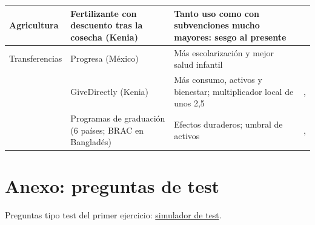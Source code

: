 \documentclass[11pt]{article}
\begin{document}
\begin{table}[H]
\begin{tabular}{>{\raggedright\arraybackslash}m{1.9cm}>{\raggedright\arraybackslash}m{4.3cm}>{\raggedright\arraybackslash}m{5.4cm}>{\raggedright\arraybackslash}m{2.9cm}}
\midrule
Agricultura & Fertilizante con descuento tras la cosecha (Kenia) & Tanto uso como con subvenciones mucho mayores: sesgo al presente & \textcite{DufloKremerRobinson2011}\\
\midrule
Transferencias & Progresa (México) & Más escolarización y mejor salud infantil & \textcite{Schultz2004}\\
 & GiveDirectly (Kenia) & Más consumo, activos y bienestar; multiplicador local de unos 2,5 & \textcite{HaushoferShapiro2016}, \textcite{EggerEtAl2022}\\
 & Programas de graduación (6 países; BRAC en Bangladés) & Efectos duraderos; umbral de activos & \textcite{BanerjeeEtAl2015Graduacion}, \textcite{BalboniEtAl2022}\\
\bottomrule
\end{tabular}

\smallskip
{}
\end{table}

\section{Anexo: preguntas de test}\label{anexo:test}

\begin{anotaciones}
Preguntas tipo test del primer ejercicio: \href{https://www.victorgutierrezmarcos.es/oposicion/temario/primer-ejercicio/test/simulador.html?tema=3.B.28}{simulador de test}.
\end{anotaciones}

\bibliografia
\end{document}
